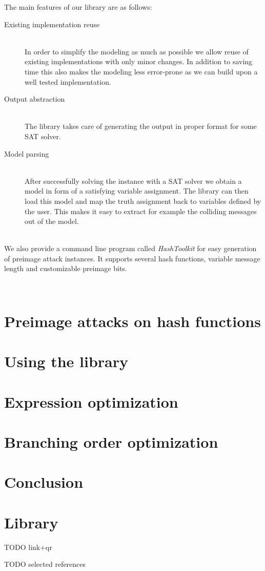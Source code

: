 \documentclass[myposter,portrait]{sciposter}
\def\mysection#1{
{\color{sectionCol}\section*{\sc\bfseries #1}}}
\begin{document}
\begin{multicols*}{3}
The main features of our library are as follows:

\begin{description}
\item[Existing implementation reuse]~\\
In order to simplify the modeling as much as possible we allow reuse of existing implementations with only minor changes.
In addition to saving time this also makes the modeling less error-prone as we can build upon a well tested implementation.

\item[Output abstraction]~\\
The library takes care of generating the output in proper format for some SAT solver.

\item[Model parsing]~\\
After successfully solving the instance with a SAT solver we obtain a model in form of a satisfying variable assignment.
The library can then load this model and map the truth assignment back to variables defined by the user.
This makes it easy to extract for example the colliding messages out of the model.
\end{description}
~\\

We also provide a command line program called \emph{HashToolkit} for easy generation of preimage attack instances.
It supports several hash functions, variable message length and customizable preimage bits.

~\\	
\mysection{Preimage attacks on hash functions}
\mysection{Using the library}

\mysection{Expression optimization}

\mysection{Branching order optimization}

\mysection{Conclusion}

\mysection{Library}
TODO link+qr

TODO selected references


\end{multicols*}
\end{document}
